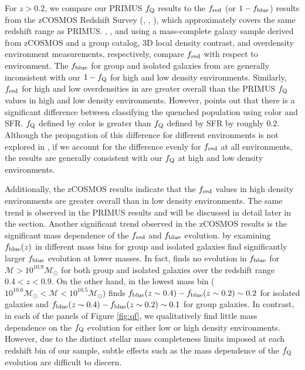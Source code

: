 \documentclass{emulateapj}
\begin{document}
For $z > 0.2$, we compare our PRIMUS $f_{\rm{Q}}$ results to the $f_{\rm{red}}$ (or $1-f_{\rm{blue}}$) results from the zCOSMOS Redshift Survey (\cite{Iovino:2010aa}, \cite{Cucciati:2010aa}, \cite{Kovac:2014aa}), which approximately covers the same redshift range as PRIMUS. \cite{Iovino:2010aa}, \cite{Cucciati:2010aa}, and \cite{Kovac:2014aa} using a mass-complete galaxy sample derived from zCOSMOS and a group catalog, 3D local density contrast, and overdensity environment measurements, respectively, compare $f_{\rm{red}}$ with respect to environment. The $f_{\rm{blue}}$ for group and isolated galaxies from \cite{Iovino:2010aa} are generally inconsistent with our $1-f_{\rm{Q}}$ for high and low density environments. Similarly, $f_{\rm{red}}$ for high and low overdensities in \cite{Kovac:2014aa} are  greater overall than the PRIMUS $f_{\rm{Q}}$ values in high and low density environments. However, \cite{Kovac:2014aa} points out that there is a significant difference between classifying the quenched population using color and SFR. $f_{\rm{Q}}$ defined by color is greater than $f_{\rm{Q}}$ defined by SFR by roughly $0.2$. Although the propagation of this difference for different environments is not explored in \cite{Kovac:2014aa}, if we account for the difference evenly for $f_{\rm{red}}$ at all environments, the \cite{Kovac:2014aa} results are generally consistent with our $f_{\rm{Q}}$ at high and low density environments. 

Additionally, the zCOSMOS results indicate that the $f_{\rm{red}}$ values in high density environments are greater overall than in low density environments. The same trend is observed in the PRIMUS results and will be discussed in detail later in the section. Another significant trend observed in the zCOSMOS results is the significant mass dependence of the $f_{\rm{red}}$ and $f_{\rm{blue}}$ evolution. \cite{Iovino:2010aa} by examining $f_{\rm{blue}}(z)$ in different mass bins for group and isolated galaxies find significantly larger $f_{\rm{blue}}$ evolution at lower masses. In fact, \cite{Iovino:2010aa} finds no evolution in $f_{\rm{blue}}$ for $\mathcal{M} > 10^{10.9} \mathcal{M}_{\odot}$ for both group and isolated galaxies over the redshift range $0.4 < z < 0.9$. On the other hand, in the lowest mass bin ($10^{10.0} \mathcal{M}_{\odot} < \mathcal{M} < 10^{10.5} \mathcal{M}_{\odot}$) \cite{Iovino:2010aa} finds $f_{\rm{blue}}(z \sim 0.4) - f_{\rm{blue}}(z \sim 0.2) \sim 0.2$ for isolated galaxies and  $f_{\rm{blue}}(z \sim 0.4) - f_{\rm{blue}}(z \sim 0.2) \sim 0.1$ for group galaxies. In contrast, in each of the panels of Figure \ref{fig:qf}, we qualitatively find little mass dependence on the $f_{\rm{Q}}$ evolution for either low or high density environments. However, due to the distinct stellar mass completeness limits imposed at each redshift bin of our sample, subtle effects such as the mass dependence of the $f_{\rm{Q}}$ evolution are difficult to discern. 
\end{document}
